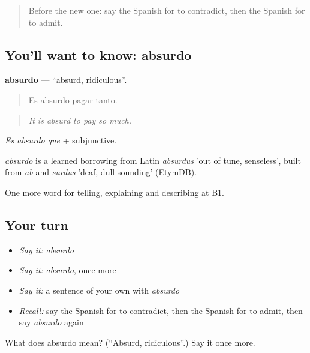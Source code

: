 \label{lesson:ES-C579-absurdo}



\begin{quote}
Before the new one: say the Spanish for to contradict, then the Spanish for to admit.
\end{quote}

\subsection*{You'll want to know: absurdo}
\textbf{absurdo} — \textquotedblleft{}absurd, ridiculous\textquotedblright{}.

\begin{quote}
Es absurdo pagar tanto.
\end{quote}

\begin{quote}
\emph{It is absurd to pay so much.}
\end{quote}

\emph{Es absurdo que} + subjunctive.

\begin{cousinweb}
\emph{absurdo} is a learned borrowing from Latin \emph{absurdus} 'out of tune, senseless', built from \emph{ab} and \emph{surdus} 'deaf, dull-sounding' (EtymDB).
\end{cousinweb}

\begin{grammarlens}[title={What you've built}]
One more word for telling, explaining and describing at B1.
\end{grammarlens}

\subsection*{Your turn}
\begin{itemize}
\raggedright
  \item \emph{Say it:} \emph{absurdo}
  \item \emph{Say it:} \emph{absurdo}, once more
  \item \emph{Say it:} a sentence of your own with \emph{absurdo}
  \item \emph{Recall:} say the Spanish for to contradict, then the Spanish for to admit, then say \emph{absurdo} again
\end{itemize}

\begin{tcolorbox}[breakable,colback=teal!4,colframe=teal!35!black,title={Before you move on}]
What does absurdo mean? (\textquotedblleft{}Absurd, ridiculous\textquotedblright{}.) Say it once more.
\end{tcolorbox}
